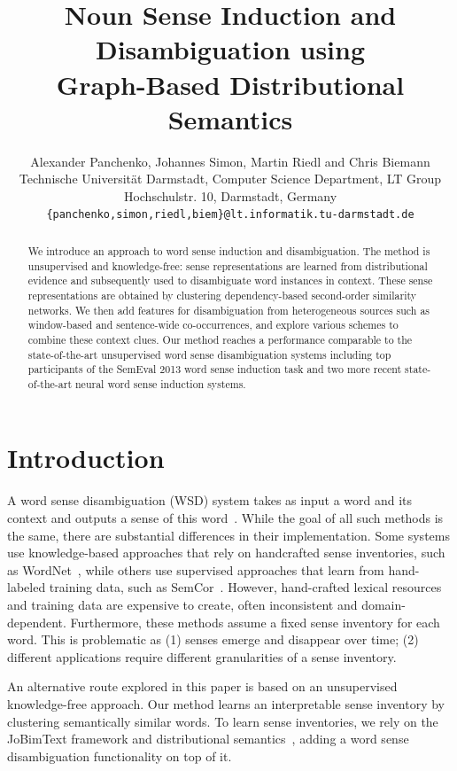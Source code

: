 \documentclass[11pt]{article}
\title{Noun Sense Induction and Disambiguation using \\ Graph-Based Distributional Semantics}
\author{Alexander Panchenko, Johannes Simon, Martin Riedl and Chris Biemann \\
  Technische Universit{\"a}t Darmstadt, Computer Science Department, LT Group  \\
  Hochschulstr. 10, Darmstadt, Germany \\
  {\tt \{panchenko,simon,riedl,biem\}@lt.informatik.tu-darmstadt.de}
  }
\date{}
\begin{document}
\maketitle
\begin{abstract}
We introduce an approach to word sense induction and disambiguation. The method is unsupervised and knowledge-free: sense representations are learned from distributional evidence and subsequently used to disambiguate word instances in context. These sense representations are obtained by clustering dependency-based second-order similarity networks. We then add features for disambiguation from heterogeneous sources such as window-based and sentence-wide co-occurrences, and explore various schemes to combine these context clues. Our method reaches a performance comparable to the state-of-the-art unsupervised word sense disambiguation systems including top participants of the SemEval 2013 word sense induction task and two more recent state-of-the-art neural word sense induction systems. 


\end{abstract}


\section{Introduction}
A word sense disambiguation (WSD) system takes as input a word and its context and outputs a sense of this word~\cite{Navigli2009}. While the goal of all such methods is the same, there are substantial differences in their implementation. Some systems use knowledge-based approaches that rely on handcrafted sense inventories, such as WordNet~\cite{miller1995wordnet}, while others use supervised approaches that learn from hand-labeled training data, such as SemCor~\cite{Miller1993}. However, hand-crafted lexical resources and training data are expensive to create, often inconsistent and domain-dependent. Furthermore, these methods assume a fixed sense inventory for each word. This is problematic as (1) senses emerge and disappear over time; (2)  different applications require different granularities of a sense inventory.

An alternative route explored in this paper is based on an unsupervised knowledge-free approach. Our method learns an interpretable sense inventory by clustering semantically similar words. To learn sense inventories, we rely on the JoBimText framework and distributional semantics~\cite{Biemann2013}, adding a word sense disambiguation functionality on top of it.
\end{document}

